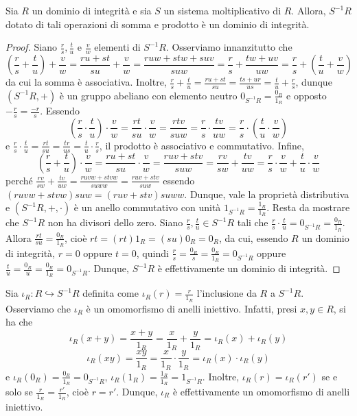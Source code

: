 \begin{prop}[1.7.3]{}
Sia $R$ un dominio di integrità e sia $S$ un sistema moltiplicativo di $R$. Allora, $S^{-1}R$ dotato di tali operazioni di somma e prodotto è un dominio di integrità.
\end{prop}
\vspace{-4mm}
\begin{proof}
Siano $\frac{r}{s}, \frac{t}{u}$ e $\frac{v}{w}$ elementi di $S^{-1}R$. Osserviamo innanzitutto che \[ \left(\frac{r}{s}+\frac{t}{u}\right)+\frac{v}{w}=\frac{ru+st}{su}+\frac{v}{w}=\frac{ruw+stw+suv}{suw}=\frac{r}{s}+\frac{tw+uv}{uw}=\frac{r}{s}+\left(\frac{t}{u}+\frac{v}{w}\right) \] da cui la somma è associativa. Inoltre, $\frac{r}{s}+\frac{t}{u}=\frac{ru+st}{su}=\frac{ts+ur}{us}=\frac{t}{u}+\frac{r}{s}$, dunque $(S^{-1}R,+)$ è un gruppo abeliano con elemento neutro $0_{S^{-1}R}=\frac{0_R}{1_R}$ e opposto $-\frac{r}{s}=\frac{-r}{s}$. Essendo \[ \left(\frac{r}{s}\cdot\frac{t}{u}\right)\cdot\frac{v}{w}=\frac{rt}{su}\cdot\frac{v}{w}=\frac{rtv}{suw}=\frac{r}{s}\cdot\frac{tv}{uw}=\frac{r}{s}\cdot\left(\frac{t}{u}\cdot\frac{v}{w}\right) \] e $\frac{r}{s}\cdot\frac{t}{u}=\frac{rt}{su}=\frac{tr}{us}=\frac{t}{u}\cdot\frac{r}{s}$, il prodotto è associativo e commutativo. Infine, \[ \left(\frac{r}{s}+\frac{t}{u}\right)\cdot \frac{v}{w}=\frac{ru+st}{su}\cdot \frac{v}{w}=\frac{ruv+stv}{suw}=\frac{rv}{sw}+\frac{tv}{uw}=\frac{r}{s}\cdot \frac{v}{w}+\frac{t}{u}\cdot \frac{v}{w} \] perché $\frac{rv}{sw}+\frac{tv}{uw}=\frac{ruvw+stvw}{suww}=\frac{ruv+stv}{suw}$ essendo $(ruvw+stvw)suw=(ruv+stv)suww$. Dunque, vale la proprietà distributiva e $(S^{-1}R,+,\cdot)$ è un anello commutativo con unità $1_{S^{-1}R}=\frac{1_R}{1_R}$. Resta da mostrare che $S^{-1}R$ non ha divisori dello zero. Siano $\frac{r}{s}, \frac{t}{u}\in S^{-1}R$ tali che $\frac{r}{s}\cdot \frac{t}{u}=0_{S^{-1}R}=\frac{0_R}{1_R}$. Allora $\frac{rt}{su}=\frac{0_R}{1_R}$, cioè $rt=(rt)1_R=(su)0_R=0_R$, da cui, essendo $R$ un dominio di integrità, $r=0$ oppure $t=0$, quindi $\frac{r}{s}=\frac{0_R}{s}=\frac{0_R}{1_R}=0_{S^{-1}R}$ oppure $\frac{t}{u}=\frac{0_R}{u}=\frac{0_R}{1_R}=0_{S^{-1}R}$. Dunque, $S^{-1}R$ è effettivamente un dominio di integrità.
\end{proof}

\noindent Sia $\iota_R\colon R\hookrightarrow S^{-1}R$ definita come $\iota_R(r)=\frac{r}{1_R}$ l'inclusione da $R$ a $S^{-1}R$. Osserviamo che $\iota_R$ è un omomorfismo di anelli iniettivo. Infatti, presi $x,y\in R$, si ha che \[\iota_R(x+y)=\frac{x+y}{1_R}=\frac{x}{1_R}+\frac{y}{1_R}=\iota_R(x)+\iota_R(y)\] \[\iota_R(xy)=\frac{xy}{1_R}=\frac{x}{1_R}\cdot \frac{y}{1_R}=\iota_R(x)\cdot \iota_R(y)\] e $\iota_R(0_R)=\frac{0_R}{1_R}=0_{S^{-1}R}$, $\iota_R(1_R)=\frac{1_R}{1_R}=1_{S^{-1}R}$. Inoltre, $\iota_R(r)=\iota_R(r')$ se e solo se $\frac{r}{1_R}=\frac{r'}{1_R}$, cioè $r=r'$. Dunque, $\iota_R$ è effettivamente un omomorfismo di anelli iniettivo. \clearpage

